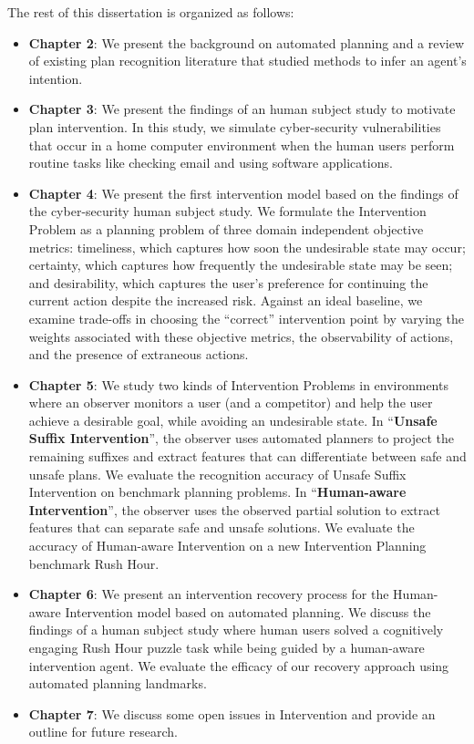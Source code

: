 The rest of this dissertation is organized as follows:
\begin{itemize}
\item \textbf{Chapter 2}: We present the background on automated planning and a review of existing plan recognition literature that studied methods to infer an agent's intention.
\item \textbf{Chapter 3}: We present the findings of an human subject study to motivate plan intervention. In this study, we simulate cyber-security vulnerabilities that occur in a home computer environment when the human users perform routine tasks like checking email and using software applications.
\item \textbf{Chapter 4}: We present the first intervention model based on the findings of the cyber-security human subject study. 
We formulate the Intervention Problem as a  planning problem of three domain independent objective metrics: timeliness, which captures how soon the undesirable state may occur; certainty, which captures how frequently the undesirable state may be seen; and desirability, which captures the user’s preference for continuing the current action despite the increased risk. 
Against an ideal baseline, we examine trade-offs in choosing the ``correct'' intervention point by varying the weights associated with these objective metrics, the observability of actions, and the presence of extraneous actions.
\item \textbf{Chapter 5}: We study two kinds of Intervention Problems in environments where an observer monitors a user (and a competitor) and help the user achieve a desirable goal, while avoiding an undesirable state. 
In ``\textbf{Unsafe Suffix Intervention}'', the observer uses automated planners to project the remaining suffixes and extract features that can differentiate between safe and unsafe plans. 
We evaluate the recognition accuracy of Unsafe Suffix Intervention on benchmark planning
problems. 
In ``\textbf{Human-aware Intervention}'', the observer uses the observed partial solution to extract features that can separate safe and unsafe solutions. 
We evaluate the accuracy of Human-aware Intervention on a new Intervention Planning benchmark Rush Hour.
\item \textbf{Chapter 6}: We present an intervention recovery process for the Human-aware Intervention model based on automated planning. 
We discuss the findings of a human subject study where human users solved a cognitively engaging Rush Hour puzzle task while being guided by a human-aware intervention agent. 
We evaluate the efficacy of our recovery approach using automated planning landmarks.
\item \textbf{Chapter 7}: We discuss some open issues in Intervention and provide an outline for future research.
\end{itemize}
